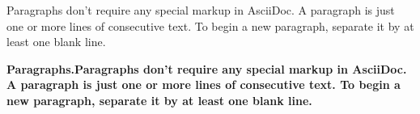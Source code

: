Paragraphs don’t require any special markup in AsciiDoc.
A paragraph is just one or more lines of consecutive text.
To begin a new paragraph, separate it by at least one blank line.

\bf{Paragraphs.}Paragraphs don’t require any special markup in AsciiDoc.
A paragraph is just one or more lines of consecutive text.
To begin a new paragraph, separate it by at least one blank line.


